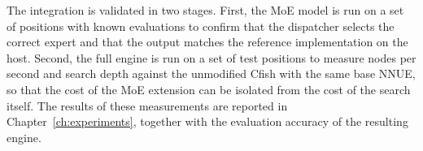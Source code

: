 The integration is validated in two stages. First, the MoE model is run on a set of positions with known evaluations to confirm that the dispatcher selects the correct expert and that the output matches the reference implementation on the host. Second, the full engine is run on a set of test positions to measure nodes per second and search depth against the unmodified Cfish with the same base NNUE, so that the cost of the MoE extension can be isolated from the cost of the search itself. The results of these measurements are reported in Chapter~\ref{ch:experiments}, together with the evaluation accuracy of the resulting engine.
